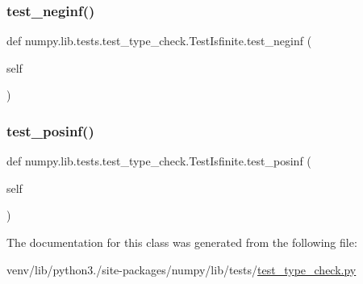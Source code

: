 \subsubsection{\texorpdfstring{test\+\_\+neginf()}{test\_neginf()}}
{\footnotesize\ttfamily def numpy.\+lib.\+tests.\+test\+\_\+type\+\_\+check.\+Test\+Isfinite.\+test\+\_\+neginf (\begin{DoxyParamCaption}\item[{}]{self }\end{DoxyParamCaption})}

\mbox{\label{classnumpy_1_1lib_1_1tests_1_1test__type__check_1_1TestIsfinite_ade4e63c4f51056991ea46d2ec01383cc}} 
\subsubsection{\texorpdfstring{test\+\_\+posinf()}{test\_posinf()}}
{\footnotesize\ttfamily def numpy.\+lib.\+tests.\+test\+\_\+type\+\_\+check.\+Test\+Isfinite.\+test\+\_\+posinf (\begin{DoxyParamCaption}\item[{}]{self }\end{DoxyParamCaption})}



The documentation for this class was generated from the following file\+:\begin{DoxyCompactItemize}
\item 
venv/lib/python3./site-\/packages/numpy/lib/tests/\hyperlink{test__type__check_8py}{test\+\_\+type\+\_\+check.\+py}\end{DoxyCompactItemize}
